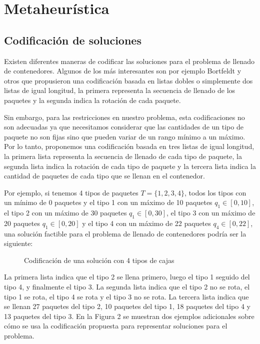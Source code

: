 \section{Metaheurística}

\subsection{Codificación de soluciones}
\label{sec:codificacion}

Existen diferentes maneras de codificar las soluciones para el problema de llenado de contenedores. Algunos de los más interesantes son por ejemplo Bortfeldt y otros \cite{GEHRING1997401} que propusieron una codificación basada en listas dobles o simplemente dos listas de igual longitud, la primera representa la secuencia de llenado de los paquetes y la segunda indica la rotación de cada paquete.

Sin embargo, para las restricciones en nuestro problema, esta codificaciones no son adecuadas ya que necesitamos considerar que las cantidades de un tipo de paquete no son fijas sino que pueden variar de un rango mínimo a un máximo. Por lo tanto, proponemos una codificación basada en tres listas de igual longitud, la primera lista representa la secuencia de llenado de cada tipo de paquete, la segunda lista indica la rotación de cada tipo de paquete y la tercera lista indica la cantidad de paquetes de cada tipo que se llenan en el contenedor.


Por ejemplo, si tenemos 4 tipos de paquetes $T=\{1,2,3,4\}$, todos los tipos con un mínimo de 0 paquetes y el tipo 1 con un máximo de 10 paquetes $q_1 \in [0,10]$, el tipo 2 con un máximo de 30 paquetes $q_1 \in [0,30]$, el tipo 3 con un máximo de 20 paquetes $q_1 \in [0,20]$ y el tipo 4 con un máximo de 22 paquetes $q_4 \in [0,22]$, una solución factible para el problema de llenado de contenedores podría ser la siguiente:

\begin{figure}[H]
    \centering
    
    \caption{Codificación de una solución con 4 tipos de cajas}
    \label{fig:codificación}
\end{figure}

La primera lista indica que el tipo 2 se llena primero, luego el tipo 1 seguido del tipo 4, y finalmente el tipo 3. La segunda lista indica que el tipo 2 no se rota, el tipo 1 se rota, el tipo 4 se rota y el tipo 3 no se rota. La tercera lista indica que se llenan 27 paquetes del tipo 2, 10 paquetes del tipo 1, 18 paquetes del tipo 4 y 13 paquetes del tipo 3. En la Figura 2 se muestran dos ejemplos adicionales sobre cómo se usa la codificación propuesta para representar soluciones para el problema.

